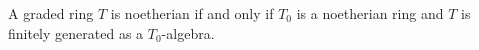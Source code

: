 A graded ring $T$ is noetherian if and only if $T_0$ is a noetherian ring and
$T$ is finitely generated as a $T_0$-algebra.
